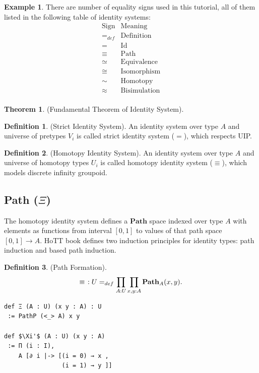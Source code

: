 \documentclass{article}
\theoremstyle{definition}
\newtheorem{definition}{Definition}
\newtheorem{theorem}{Theorem}
\newtheorem{example}{Example}
\begin{document}
\begin{example}
There are number of equality signs used in this tutorial,
all of them listed in the following table of identity systems:
$$
\begin{array}{ll} \mathrm{Sign} & \mathrm{Meaning} \\
                         \hline
                        =_{def} & \mathrm{Definition} \\
                              = & \mathrm{Id} \\
                         \equiv & \mathrm{Path} \\
                         \simeq & \mathrm{Equivalence} \\
                          \cong & \mathrm{Isomorphism} \\
                           \sim & \mathrm{Homotopy} \\
                        \approx & \mathrm{Bisimulation} \\
                      \end{array}
$$
\end{example}

\begin{theorem} (Fundamental Theorem of Identity System).
\end{theorem}

\begin{definition} (Strict Identity System).
An identity system over type $A$ and universe
of pretypes $V_i$ is called strict identity system ($=$), which respects UIP.
\end{definition}

\begin{definition} (Homotopy Identity System).
An identity system over type $A$ and universe of homotopy
types $U_i$ is called homotopy identity system ($\equiv$),
which models discrete infinity groupoid.
\end{definition}

\newpage
\subsection{Path ($\Xi$)}
The homotopy identity system defines a $\mathbf{Path}$
space indexed over type $A$
with elements as functions from interval $[0,1]$ to values
of that path space $[0,1] \rightarrow A$. HoTT book
defines two induction principles for identity types:
path induction and based path induction.

\begin{definition} (Path Formation).
$$
  \equiv\hspace{0.4em}: U =_{def} \prod_{A:U}\prod_{x,y:A} \mathbf{Path}_A(x,y).
$$
\begin{lstlisting}[mathescape=true]
def Ξ (A : U) (x y : A) : U
 := PathP (<_> A) x y

def $\Xi'$ (A : U) (x y : A)
 := Π (i : I),
    A [∂ i |-> [(i = 0) → x ,
                (i = 1) → y ]]
\end{lstlisting}
\end{definition}
\end{document}
